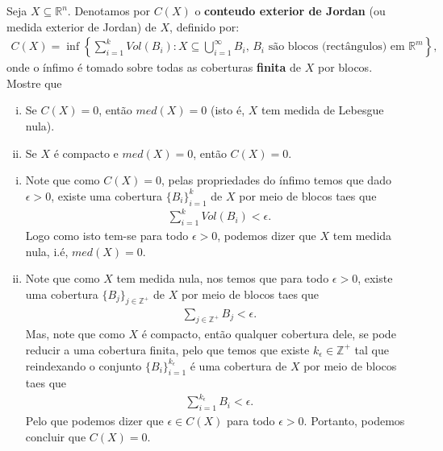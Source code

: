 \begin{homeworkProblem}[Seção 2-2]
  Seja $X\subseteq\mathbb{R}^{n}$. Denotamos por $C(X)$ o \textbf{conteudo exterior de Jordan} (ou medida exterior de Jordan) de $X$, definido por:
  \begin{align*}
    C(X)=\inf\left\{ \sum_{i=1}^{k}Vol(B_i):X\subseteq\bigcup_{i=1}^{\infty}B_i,\,B_i\text{ são blocos (rectângulos) em }\mathbb{R}^{m} \right\},
  \end{align*}
  onde o ínfimo é tomado sobre todas as coberturas \textbf{finita} de $X$ por blocos.\\
  Mostre que
  \begin{enumerate}[(i)]
    \item Se $C(X)=0$, então $med(X)=0$ (isto é, $X$ tem medida de Lebesgue nula).
    \item Se $X$ é compacto e $med(X)=0$, então $C(X)=0$. 
  \end{enumerate}
  \begin{solution}
  \begin{enumerate}[(i)]
    \item Note que como $C(X)=0$, pelas propriedades do ínfimo temos que dado $\epsilon>0$, existe uma cobertura $\{B_i\}_{i=1}^{k}$ de $X$ por meio de blocos taes que
      \begin{align*}
        \sum_{i=1}^{k}Vol(B_i)<\epsilon.
      \end{align*}
      Logo como isto tem-se para todo $\epsilon>0$, podemos dizer que $X$ tem medida nula, i.é, $med(X)=0$.
    \item Note que como $X$ tem medida nula, nos temos que para todo $\epsilon>0$, existe uma cobertura $\{B_j\}_{j\in\mathbb{Z}^{+}}$ de $X$ por meio de blocos taes que
      \begin{align*}
        \sum_{j\in\mathbb{Z}^{+}}B_j<\epsilon.
      \end{align*}
      Mas, note que como $X$ é compacto, então qualquer cobertura dele, se pode reducir a uma cobertura finita, pelo que temos que existe $k_\epsilon\in\mathbb{Z}^{+}$ tal que reindexando o conjunto $\{B_{i}\}_{i=1}^{k_\epsilon}$ é uma cobertura de $X$ por meio de blocos taes que
      \begin{align*}
        \sum_{i=1}^{k_{\epsilon}}B_i<\epsilon.
      \end{align*}
      Pelo que podemos dizer que $\epsilon\in C(X)$ para todo $\epsilon>0$. Portanto, podemos concluir que $C(X)=0$. 
  \end{enumerate} 
  \end{solution}
\end{homeworkProblem}
